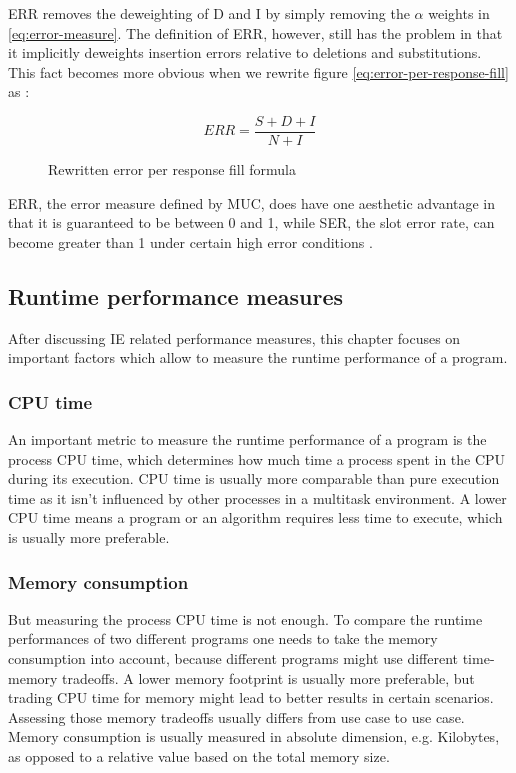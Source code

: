 ERR removes the deweighting of D and I by simply removing the $\alpha$ weights in \ref{eq:error-measure}. The definition of ERR, however, still has the problem in that it implicitly deweights insertion errors relative to deletions and substitutions. This fact becomes more obvious when we rewrite figure \ref{eq:error-per-response-fill} as \cite{Makhoul:1999}:

\begin{figure}[H]
\begin{displaymath}
	ERR = \frac{S+D+I}{N+I}
\end{displaymath}
\caption{Rewritten error per response fill formula}
\label{eq:error-per-response-fill2}
\end{figure}

ERR, the error measure defined by MUC, does have one aesthetic advantage in that it is guaranteed to be between 0 and 1, while SER, the slot error rate, can become greater than 1 under certain high error conditions \cite{Makhoul:1999}.

\subsection{Runtime performance measures}
After discussing \gls{IE} related performance measures, this chapter focuses on important factors which allow to measure the runtime performance of a program.

\subsubsection{CPU time}
An important metric to measure the runtime performance of a program is the process CPU time, which determines how much time  a process spent in the CPU during its execution. CPU time is usually more comparable than pure execution time as it isn't influenced by other processes in a multitask environment. A lower CPU time means a program or an algorithm requires less time to execute, which is usually more preferable.

\subsubsection{Memory consumption}
But measuring the process CPU time is not enough. To compare the runtime performances of two different programs one needs to take the memory consumption into account, because different programs might use different time-memory tradeoffs. A lower memory footprint is usually more preferable, but trading CPU time for memory might lead to better results in certain scenarios. Assessing those memory tradeoffs usually differs from use case to use case. Memory consumption is usually measured in absolute dimension, e.g. Kilobytes, as opposed to a relative value based on the total memory size.

